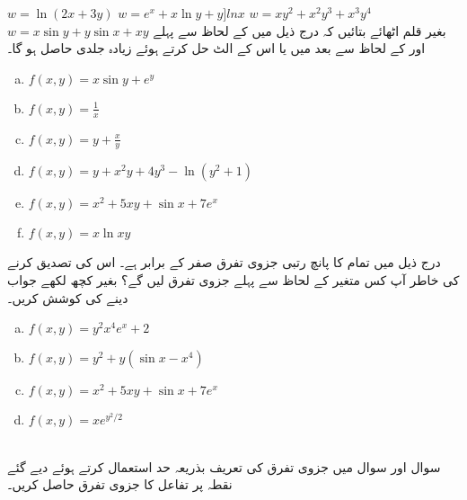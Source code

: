 $w=\ln(2x+3y)$
$w=e^x+x\ln y+y]ln x$
$w=xy^2+x^2y^3+x^3y^4$
$w=x\sin y+y\sin x+xy$
بغیر قلم اٹھائے   بتائیں کہ درج ذیل میں  کے لحاظ سے پہلے اور  کے  لحاظ سے بعد میں یا اس کے الٹ حل کرتے ہوئے   زیادہ جلدی حاصل ہو گا۔
\begin{enumerate}[a.]
\item
$f(x,y)=x\sin y+e^y$
\item
$f(x,y)=\frac{1}{x}$
\item
$f(x,y)=y+\frac{x}{y}$
\item
$f(x,y)=y+x^2y+4y^3-\ln(y^2+1)$
\item
$f(x,y)=x^2+5xy+\sin x+7e^x$
\item
$f(x,y)=x\ln xy$
\end{enumerate}
درج ذیل میں تمام کا پانچ رتبی جزوی تفرق  صفر کے برابر ہے۔ اس کی تصدیق کرنے کی خاطر آپ کس متغیر کے لحاظ سے پہلے جزوی تفرق لیں گے؟ بغیر کچھ لکھے جواب دینے کی کوشش کریں۔
\begin{enumerate}[a.]
\item
$f(x,y)=y^2x^4e^x+2$
\item
$f(x,y)=y^2+y(\sin x-x^4)$
\item
$f(x,y)=x^2+5xy+\sin x+7e^x$
\item
$f(x,y)=xe^{y^2/2}$
\end{enumerate}

\\
سوال  اور سوال  میں جزوی تفرق کی تعریف بذریعہ حد استعمال کرتے ہوئے دیے گئے نقطہ پر تفاعل کا جزوی تفرق حاصل کریں۔

